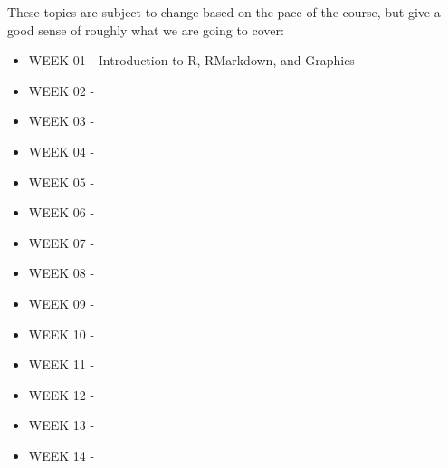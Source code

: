 \documentclass[12pt]{article}
\begin{document}
These topics are subject to change based on the pace of the course, but
give a good sense of roughly what we are going to cover:

\vspace{0.5cm}

\def\labelitemi{}
\def\labelitemii{}

\begin{itemize}\setlength\itemsep{0em}
\item WEEK 01 - Introduction to R, RMarkdown, and Graphics
\item WEEK 02 -
\item WEEK 03 -
\item WEEK 04 -
\item WEEK 05 -
\item WEEK 06 -
\item WEEK 07 -
\item WEEK 08 -
\item WEEK 09 -
\item WEEK 10 -
\item WEEK 11 -
\item WEEK 12 -
\item WEEK 13 -
\item WEEK 14 -
\end{itemize}
\end{document}
